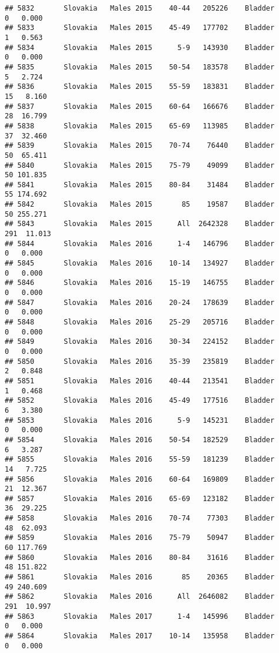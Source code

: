 \documentclass[
]{article}
\begin{document}
\begin{verbatim}
## 5832       Slovakia   Males 2015    40-44   205226    Bladder      0   0.000
## 5833       Slovakia   Males 2015    45-49   177702    Bladder      1   0.563
## 5834       Slovakia   Males 2015      5-9   143930    Bladder      0   0.000
## 5835       Slovakia   Males 2015    50-54   183578    Bladder      5   2.724
## 5836       Slovakia   Males 2015    55-59   183831    Bladder     15   8.160
## 5837       Slovakia   Males 2015    60-64   166676    Bladder     28  16.799
## 5838       Slovakia   Males 2015    65-69   113985    Bladder     37  32.460
## 5839       Slovakia   Males 2015    70-74    76440    Bladder     50  65.411
## 5840       Slovakia   Males 2015    75-79    49099    Bladder     50 101.835
## 5841       Slovakia   Males 2015    80-84    31484    Bladder     55 174.692
## 5842       Slovakia   Males 2015       85    19587    Bladder     50 255.271
## 5843       Slovakia   Males 2015      All  2642328    Bladder    291  11.013
## 5844       Slovakia   Males 2016      1-4   146796    Bladder      0   0.000
## 5845       Slovakia   Males 2016    10-14   134927    Bladder      0   0.000
## 5846       Slovakia   Males 2016    15-19   146755    Bladder      0   0.000
## 5847       Slovakia   Males 2016    20-24   178639    Bladder      0   0.000
## 5848       Slovakia   Males 2016    25-29   205716    Bladder      0   0.000
## 5849       Slovakia   Males 2016    30-34   224152    Bladder      0   0.000
## 5850       Slovakia   Males 2016    35-39   235819    Bladder      2   0.848
## 5851       Slovakia   Males 2016    40-44   213541    Bladder      1   0.468
## 5852       Slovakia   Males 2016    45-49   177516    Bladder      6   3.380
## 5853       Slovakia   Males 2016      5-9   145231    Bladder      0   0.000
## 5854       Slovakia   Males 2016    50-54   182529    Bladder      6   3.287
## 5855       Slovakia   Males 2016    55-59   181239    Bladder     14   7.725
## 5856       Slovakia   Males 2016    60-64   169809    Bladder     21  12.367
## 5857       Slovakia   Males 2016    65-69   123182    Bladder     36  29.225
## 5858       Slovakia   Males 2016    70-74    77303    Bladder     48  62.093
## 5859       Slovakia   Males 2016    75-79    50947    Bladder     60 117.769
## 5860       Slovakia   Males 2016    80-84    31616    Bladder     48 151.822
## 5861       Slovakia   Males 2016       85    20365    Bladder     49 240.609
## 5862       Slovakia   Males 2016      All  2646082    Bladder    291  10.997
## 5863       Slovakia   Males 2017      1-4   145996    Bladder      0   0.000
## 5864       Slovakia   Males 2017    10-14   135958    Bladder      0   0.000

\end{verbatim}
\end{document}
